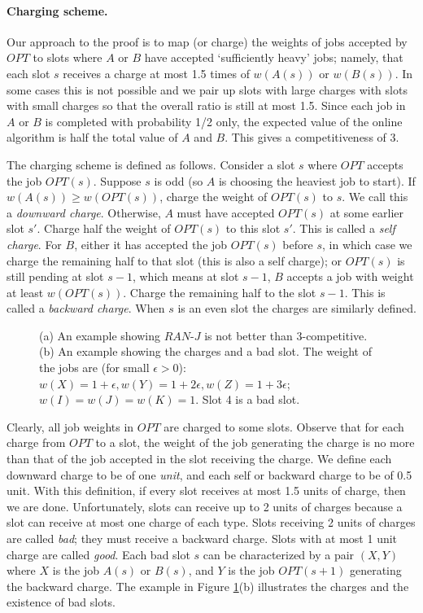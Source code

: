\documentclass[11pt]{article}
\begin{document}
\paragraph{Charging scheme.}
Our approach to the proof is to map (or charge) the weights of jobs 
accepted by $OPT$ to slots where $A$ or $B$ have accepted `sufficiently
heavy' jobs; namely, that each slot $s$ 
receives a charge at most 1.5 times of $w(A(s))$ or $w(B(s))$.
In some cases this is not possible and we pair up slots with large charges
with slots with small charges so that the overall ratio is still at most
1.5.  Since each job in $A$ or $B$ is completed with probability 1/2 only,
the expected value of the online algorithm is half the total value of 
$A$ and $B$.  This gives a competitiveness of 3.

The charging scheme is defined as follows.
Consider a slot $s$ where $OPT$ accepts the job $OPT(s)$.
Suppose $s$ is odd (so $A$ is choosing the heaviest job to start).
If $w(A(s)) \ge w(OPT(s))$, charge the weight of $OPT(s)$ to $s$.
We call this a {\it downward charge}.
Otherwise, $A$ must have 
accepted $OPT(s)$ at some earlier slot $s'$.
Charge half the weight of $OPT(s)$ to this slot $s'$.
This is called a {\it self charge}.
For $B$, either it has accepted the job $OPT(s)$ before $s$, 
in which case we charge the remaining half to that slot
(this is also a self charge);
or $OPT(s)$ is still pending at slot $s-1$, which means at slot $s-1$, 
$B$ accepts a job with weight at least $w(OPT(s))$.
Charge the remaining half to the slot $s-1$.
This is called a {\it backward charge}.
When $s$ is an even slot the charges are similarly defined.

\begin{figure}
\centerline{ \epsfysize=2in  }
\caption{(a) An example showing $RAN$-$J$ is not better than 3-competitive.
(b) An example showing the charges and a bad slot.
The weight of the jobs are (for small $\epsilon>0$):
$w(X)=1+\epsilon, w(Y)=1+2\epsilon, w(Z)=1+3\epsilon$;
$w(I)=w(J)=w(K)=1$. Slot 4 is a bad slot.}
\label{fig:ran-j}
\end{figure}

Clearly, all job weights in $OPT$ are charged to some slots.
Observe that for each charge from $OPT$ to a slot,
the weight of the job generating the charge is no more than
that of the job accepted in the slot receiving the charge.
We define each downward charge to be of one {\it unit}, and each self
or backward charge to be of 0.5 unit.
With this definition, if every slot receives at most 1.5 units of charge, 
then we are done.
Unfortunately, slots can receive up to 2 units of charges
because a slot can receive at most one charge of each type.
Slots receiving 2 units of charges are called {\it bad}; they must receive
a backward charge.
Slots with at most 1 unit charge are called {\it good}.  
Each bad slot $s$ can be characterized by a pair $(X,Y)$ where $X$ is the 
job $A(s)$ or $B(s)$, and $Y$ is the job $OPT(s+1)$ generating the backward
charge.
The example in Figure \ref{fig:ran-j}(b) illustrates the charges 
and the existence of bad slots.
\end{document}
